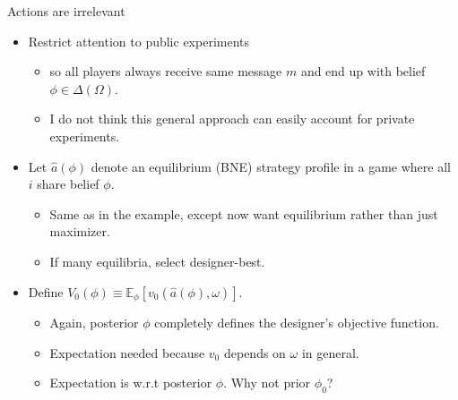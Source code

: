 \documentclass[english,10pt
,aspectratio=169
]{beamer}
\begin{document}
\begin{frame}{Actions are irrelevant}
\begin{itemize}
	\item Restrict attention to \alert{public experiments}
	\begin{itemize}
		\item so all players always receive same message $m$ and end up with  belief $\phi \in \varDelta (\Omega)$.
		\item I do not think this general approach can easily account for private experiments.
	\end{itemize}
	\item Let $\hat{a}(\phi)$ denote an equilibrium (BNE) strategy profile in a game where all $i$ share belief $\phi$.
	\begin{itemize}
		\item Same as in the example, except now want equilibrium rather than just maximizer.
		\item If many equilibria, select designer-best.
	\end{itemize}
	\item Define $V_0 (\phi) \equiv \mathbb{E}_{\phi} \left[v_0 (\hat{a}(\phi), \omega)\right]$.
	\begin{itemize}
		\item Again, posterior $\phi$ completely defines the designer's objective function.
		\item Expectation needed because $v_0$ depends on $\omega$ in general.
		\item Expectation is w.r.t posterior $\phi$. Why not prior $\phi_0$?
	\end{itemize}
\end{itemize}
\end{frame}


\end{document}

